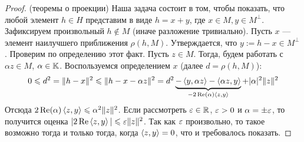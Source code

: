 \begin{proof} (теоремы о проекции)
	Наша задача состоит в том, чтобы показать, что любой элемент $h \in H$ представим в виде $h = x + y$, где $x \in M, y \in M^\bot$. Зафиксируем произвольный $h \notin M$ (иначе разложение тривиально). Пусть $x$ --- элемент наилучшего приближения $\rho(h, M)$.  Утверждается, что $y := h - x \in M^\bot$. Проверим по определению этот факт. Пусть $z \in M$. Тогда, будем работать с $\alpha z \in M$, $\alpha \in \mathbb{K}$. Воспользуемся определением $x$ (далее $d = \rho(h, M)$):
	\[
		0 \leqslant d^2 = \|h - x\|^2 \leqslant \|h - x - \alpha z\|^2 = d^2\underbrace{ - \left\langle y, \alpha z\right\rangle - \left\langle\alpha z, y\right\rangle}_{-2\operatorname{Re}(\alpha)\left\langle z, y\right\rangle} + |\alpha|^2\|z\|^2
	\]
	Отсюда $2\operatorname{Re}(\alpha) \left\langle z, y\right\rangle \leqslant \alpha^2\|z\|^2$. Если рассмотреть $\varepsilon \in \mathbb{R}$, $\varepsilon > 0$ и $\alpha = \pm \varepsilon$, то получится оценка $|2\operatorname{Re} \left\langle z, y\right\rangle| \leqslant \varepsilon \|z\|^2$. Так как $\varepsilon$ произвольно, то такое возможно тогда и только тогда, когда $\left\langle z, y\right\rangle = 0$, что и требовалось показать.
\end{proof}